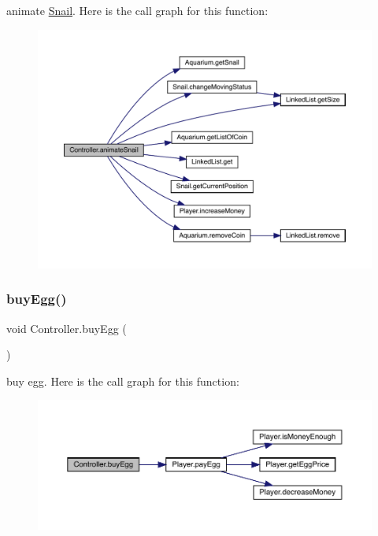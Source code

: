 animate \mbox{\hyperlink{class_snail}{Snail}}. Here is the call graph for this function\+:
\nopagebreak
\begin{figure}[H]
\begin{center}
\leavevmode
\includegraphics[width=350pt]{class_controller_a76a0629c8b8af69dfbf0cead4e6d04c3_cgraph}
\end{center}
\end{figure}
\mbox{\label{class_controller_a278f0ba8f8978834619465f1eb357175}} 
\subsubsection{\texorpdfstring{buy\+Egg()}{buyEgg()}}
{\footnotesize\ttfamily void Controller.\+buy\+Egg (\begin{DoxyParamCaption}{ }\end{DoxyParamCaption})\hspace{0.3cm}{\ttfamily [inline]}}

buy egg. Here is the call graph for this function\+:
\nopagebreak
\begin{figure}[H]
\begin{center}
\leavevmode
\includegraphics[width=350pt]{class_controller_a278f0ba8f8978834619465f1eb357175_cgraph}
\end{center}
\end{figure}
\mbox{\label{class_controller_a40a60157abffab52f9170ffb6579151e}} 
